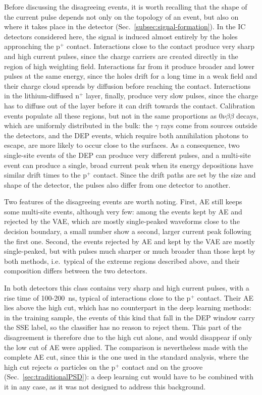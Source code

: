 Before discussing the disagreeing events, it is worth recalling that the shape of the current pulse depends not only on the topology of an event, but also on where it takes place in the detector (Sec.~\ref{subsec:signal-formation}). In the IC detectors considered here, the signal is induced almost entirely by the holes approaching the p$^+$ contact. Interactions close to the contact produce very sharp and high current pulses, since the charge carriers are created directly in the region of high weighting field. Interactions far from it produce broader and lower pulses at the same energy, since the holes drift for a long time in a weak field and their charge cloud spreads by diffusion before reaching the contact. Interactions in the lithium-diffused n$^+$ layer, finally, produce very slow pulses, since the charge has to diffuse out of the layer before it can drift towards the contact. Calibration events populate all these regions, but not in the same proportions as $0\nu\beta\beta$ decays, which are uniformly distributed in the bulk: the $\gamma$ rays come from sources outside the detectors, and the \ac{DEP} events, which require both annihilation photons to escape, are more likely to occur close to the surfaces. As a consequence, two single-site events of the \ac{DEP} can produce very different pulses, and a multi-site event can produce a single, broad current peak when its energy depositions have similar drift times to the p$^+$ contact. Since the drift paths are set by the size and shape of the detector, the pulses also differ from one detector to another.

Two features of the disagreeing events are worth noting. First, \ac{AE} still keeps some multi-site events, although very few: among the events kept by \ac{AE} and rejected by the \ac{VAE}, which are mostly single-peaked waveforms close to the decision boundary, a small number show a second, larger current peak following the first one. Second, the events rejected by \ac{AE} and kept by the \ac{VAE} are mostly single-peaked, but with pulses much sharper or much broader than those kept by both methods, i.e.\ typical of the extreme regions described above, and their composition differs between the two detectors.

In both detectors this class contains very sharp and high current pulses, with a rise time of 100-200~ns, typical of interactions close to the p$^+$ contact. Their \ac{AE} lies above the high cut, which has no counterpart in the deep learning methods: in the training sample, the events of this kind that fall in the \ac{DEP} window carry the \ac{SSE} label, so the classifier has no reason to reject them. This part of the disagreement is therefore due to the high cut alone, and would disappear if only the low cut of \ac{AE} were applied. The comparison is nevertheless made with the complete \ac{AE} cut, since this is the one used in the standard analysis, where the high cut rejects $\alpha$ particles on the p$^+$ contact and on the groove (Sec.~\ref{sec:traditionalPSD}): a deep learning cut would have to be combined with it in any case, as it was not designed to address this background.

